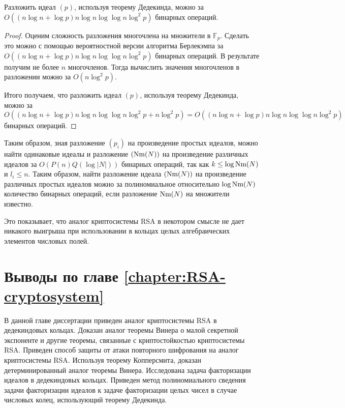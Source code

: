 \documentclass[_00_dissertation.tex]{subfiles}
\begin{document}
\begin{proposition}
    Разложить идеал $(p)$, используя теорему Дедекинда, можно за $O((n\log n + \log p)n\log n\log\log n\log^2 p)$ бинарных операций.
\end{proposition}
\begin{proof}
    Оценим сложность разложения многочлена на множители в $\mathbb{F}_p$.
    Сделать это можно с помощью вероятностной версии алгоритма Берлекэмпа за $O((n\log n + \log p)n\log n\log\log n\log^2 p)$ бинарных операций.
    В результате получим не более $n$ многочленов.
    Тогда вычислить значения многочленов в разложении можно за $O(n\log^2 p)$.

    Итого получаем, что разложить идеал $(p)$, используя теорему Дедекинда, можно за $O((n\log n + \log p)n\log n\log\log n\log^2 p + n\log^2 p) = O((n\log n + \log p)n\log n\log\log n\log^2 p)$ бинарных операций.
\end{proof}

\begin{remark}
    Таким образом, зная разложение $(p_i)$ на произведение простых идеалов, можно найти одинаковые идеалы и разложение $(\textrm{Nm}(N))$ на произведение различных идеалов за $O(P(n)Q(\log |N|))$ бинарных операций, так как $k \le \log \textrm{Nm}(N)$ и $l_i \le n$.
    Таким образом, найти разложение идеала $(\textrm{Nm}(N))$ на произведение различных простых идеалов можно за полиномиальное относительно $\log\textrm{Nm}(N)$ количество бинарных операций, если разложение $\textrm{Nm}(N)$ на множители известно.

    Это показывает, что аналог криптосистемы RSA в некотором смысле не дает никакого выигрыша при использовании в кольцах целых алгебраических элементов числовых полей.
\end{remark}

\section*{Выводы по главе \ref{chapter:RSA-cryptosystem}}

В данной главе диссертации приведен аналог криптосистемы RSA в дедекиндовых кольцах.
Доказан аналог теоремы Винера о малой секретной экспоненте и другие теоремы, связанные с криптостойкостью криптосистемы RSA.
Приведен способ защиты от атаки повторного шифрования на аналог криптосистемы RSA.
Используя теорему Копперсмита, доказан детерминированный аналог теоремы Винера.
Исследована задача факторизации идеалов в дедекиндовых кольцах.
Приведен метод полиномиального сведения задачи факторизации идеалов к задаче факторизации целых чисел в случае числовых колец, использующий теорему Дедекинда.

\onlyinsubfile{
    
}
\end{document}
